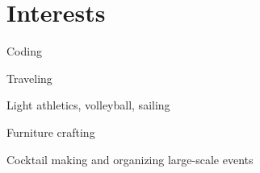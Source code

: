 \section{Interests}

\begin{highlights}
    \item Coding
    \item Traveling
    \item Light athletics, volleyball, sailing
    \item Furniture crafting
    \item Cocktail making and organizing large-scale events
\end{highlights}
